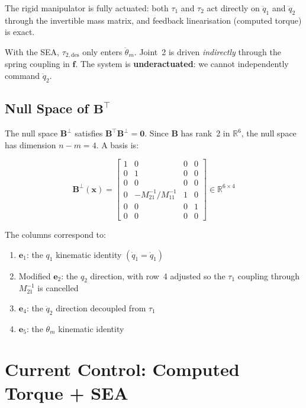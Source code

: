 \documentclass[11pt, a4paper]{article}
\newcommand{\bx}{\bm{x}}
\newcommand{\bB}{\bm{B}}
\newcommand{\R}{\mathbb{R}}
\begin{document}
\noindent
The rigid manipulator is fully actuated: both $\tau_1$ and $\tau_2$ act
directly on $\ddot{q}_1$ and $\ddot{q}_2$ through the invertible mass
matrix, and feedback linearisation (computed torque) is exact.

With the SEA, $\tau_{2,\text{des}}$ only enters $\ddot{\theta}_m$.
Joint~2 is driven \emph{indirectly} through the spring coupling in $\bm{f}$.
The system is \textbf{underactuated}: we cannot independently command $\ddot{q}_2$.

\subsection{Null Space of \texorpdfstring{$\bB^\top$}{B-transpose}}

The null space $\bB^\perp$ satisfies $\bB^\top \bB^\perp = \bm{0}$.
Since $\bB$ has rank~2 in $\R^6$, the null space has dimension
$n - m = 4$.  A basis is:

\begin{equation}
\label{eq:Bbot}
\bB^\perp(\bx) =
\begin{bmatrix}
1 & 0 & 0 & 0 \\
0 & 1 & 0 & 0 \\
0 & 0 & 0 & 0 \\
0 & -M^{-1}_{21}/M^{-1}_{11} & 1 & 0 \\
0 & 0 & 0 & 1 \\
0 & 0 & 0 & 0
\end{bmatrix}
\in \R^{6 \times 4}
\end{equation}

The columns correspond to:
\begin{enumerate}
\item $\bm{e}_1$: the $q_1$ kinematic identity $(\dot{q}_1 = \dot{q}_1)$
\item Modified $\bm{e}_2$: the $q_2$ direction, with row~4 adjusted so
      the $\tau_1$ coupling through $M^{-1}_{21}$ is cancelled
\item $\bm{e}_4$: the $\ddot{q}_2$ direction decoupled from $\tau_1$
\item $\bm{e}_5$: the $\theta_m$ kinematic identity
\end{enumerate}


\section{Current Control: Computed Torque + SEA}
\label{sec:ct}
\end{document}
